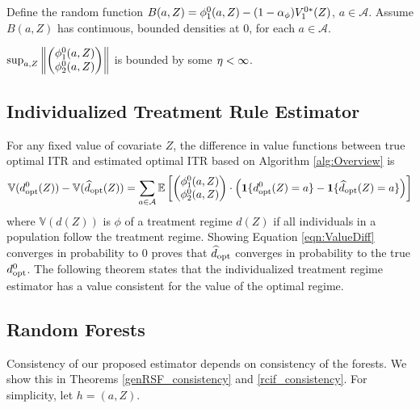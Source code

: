 \begin{assumption}
\label{assump:boundeddensity}
Define the random function $B(a,Z) = \phi_1^0(a,Z) - (1-\alpha_{\phi})V_1^{0*}(Z)$, $a \in \mathcal{A}$. Assume $B(a,Z)$ has continuous, bounded densities at 0, for each $a \in \mathcal{A}$.
\end{assumption}

\begin{assumption}
\label{assump:boundedV0}
    $\sup_{a,Z} \left\| \begin{pmatrix}\phi_1^0(a,Z) \\ \phi_2^0(a,Z) \end{pmatrix} \right\|$ is bounded by some $\eta < \infty$.
\end{assumption}

\subsection{Individualized Treatment Rule Estimator}
\label{Sec:ITRestimator_Consistency}

For any fixed value of covariate $Z$, the difference in value functions between true optimal ITR and estimated optimal ITR based on Algorithm \ref{alg:Overview} is
\begin{equation}
\label{eqn:ValueDiff}
    \mathbb{V}(d^0_{\text{opt}}(Z)) - \mathbb{V}(\widehat{d}_{\text{opt}}(Z)) = \sum_{a \in \mathcal{A}} \mathbb{E}\left[ \begin{pmatrix}\phi_1^0(a,Z) \\ \phi_2^0(a,Z) \end{pmatrix}
\cdot \left( \mathbf{1}\{d^0_{\text{opt}}(Z) = a\} - \mathbf{1}\{\widehat{d}_{\text{opt}}(Z) = a\} \right)
\right]
\end{equation}
where \( \mathbb{V}(d(Z)) \) is $\phi$ of a treatment regime \( d(Z) \) if all individuals in a population follow the treatment regime. Showing Equation \cref{eqn:ValueDiff} converges in probability to $0$ proves that $\widehat{d}_{\text{opt}}$ converges in probability to the true $d^0_{\text{opt}}$. The following theorem states that the individualized treatment regime estimator has a value consistent for the value of the optimal regime.

 
\ITRconsistency


\PRELIMproofITR

\subsection{Random Forests}
\label{Sec:Forest_Consistency}
Consistency of our proposed estimator depends on consistency of the forests. We show this in Theorems \ref{genRSF_consistency} and \ref{rcif_consistency}. For simplicity, let $h = (a,Z)$.


\genrsfconsistency
{}\prelim
{
\proofSM
} \fi

\rcifconsistency

\ifnum{}
\ifnum{}

\PRELIMproofRCIF
\fi
\fi

